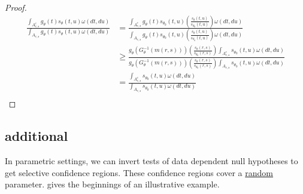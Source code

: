 \documentclass{article}
\begin{document}
\begin{appendix}
\begin{proof}
        \begin{align*}
            \frac{ \int_{A_{r, s}^c} g_{\theta}(t) s_{\theta}(t, u) \omega(dt, du)} { \int_{A_{r, s}}  g_{\theta}(t) s_{\theta}(t, u) \omega(dt, du)} &=\frac{ \int_{A_{r, s}^c} g_{\theta}(t) s_{\theta_0}(t, u) \left( \frac{s_{\theta}(t, u) }{s_{\theta_0}(t, u)} \right) \omega(dt, du)} { \int_{A_{r, s}}  g_{\theta}(t) s_{\theta_0}(t, u) \left( \frac{s_{\theta}(t, u) }{s_{\theta_0}(t, u)} \right) \omega(dt, du)}\\
                &\geq \frac{g_{\theta}(G_{\theta}^{-1}(m(r, s))) \left( \frac{s_{\theta}(r, s) }{s_{\theta_0}(r, s)} \right)   \int_{A_{r, s}^c} s_{\theta_0}(t, u) \omega(dt, du)}{ g_{\theta}(G_{\theta}^{-1}(m(r, s))) \left( \frac{s_{\theta}(r, s) }{s_{\theta_0}(r, s)} \right)  \int_{A_{r, s}} s_{\theta_0}(t, u) \omega(dt, du)}\\
                &= \frac{  \int_{A_{r, s}^c} s_{\theta_0}(t, u) \omega(dt, du)}{   \int_{A_{r, s}} s_{\theta_0}(t, u) \omega(dt, du)}\\
        \end{align*}

\end{proof}

\subsection{additional}
\label{sec:sel_conf_region_appdx}

In parametric settings, we can  invert tests of data dependent null hypotheses to get selective confidence regions. These confidence regions cover a \underline{random} parameter.  gives the beginnings of an illustrative example. 


\end{appendix}
\end{document}
